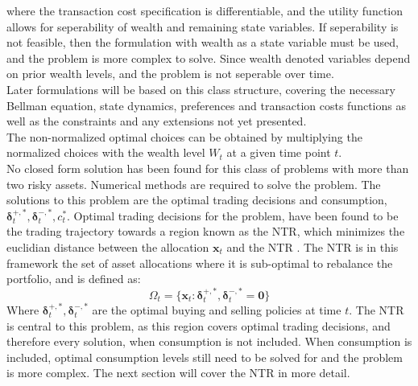 \documentclass[11pt]{article}
\begin{document}
where the transaction cost specification is differentiable, and the utility function allows for seperability of wealth and remaining state variables.
If seperability is not feasible, then the formulation with wealth as a state variable must be used, and the problem is more complex to solve.
Since wealth denoted variables depend on prior wealth levels, and the problem is not seperable over time.\\
Later formulations will be based on this class structure, covering the necessary Bellman equation, state dynamics, preferences and transaction costs functions as well as the constraints
and any extensions not yet presented.\\
The non-normalized optimal choices can be obtained by multiplying the normalized choices with the wealth level $W_t$ at a given time point $t$.\\
No closed form solution has been found for this class of problems with more than two risky assets. Numerical methods are required to solve the problem.
The solutions to this problem are the optimal trading decisions and consumption, $\boldsymbol{\delta}^{+,*}_t , \boldsymbol{\delta}^{-,*}_t, c^{*}_{t}$.
Optimal trading decisions for the problem, have been found to be the trading trajectory towards a region known as the \ac{NTR},
which minimizes the euclidian distance between the allocation $\mathbf{x}_{t}$ and the \ac{NTR} \autocite{CaiJuddXu2013}.
The \ac{NTR} is in this framework the set of asset allocations where it is sub-optimal to rebalance the portfolio, and is defined as:
\begin{equation}
  \label{eq:No_Trade_Region}
  \Omega_t = \{ \mathbf{x}_{t} : \boldsymbol{\delta}^{+,*}_t , \boldsymbol{\delta}^{-,*}_t = \mathbf{0} \}
\end{equation}
Where $\boldsymbol{\delta}^{+,*}_t , \boldsymbol{\delta}^{-,*}_t$ are the optimal buying and selling policies at time $t$.
The NTR is central to this problem, as this region covers optimal trading decisions, and therefore every solution, when consumption is not included.
When consumption is included, optimal consumption levels still need to be solved for and the problem is more complex.
The next section will cover the \ac{NTR} in more detail.
\end{document}
